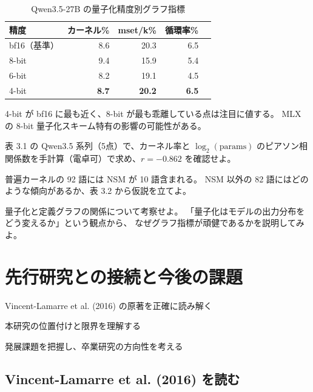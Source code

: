 \documentclass[lang=jp, color=black, mode=simple, 11pt]{elegantbook}
\begin{document}
\begin{table}[htbp]
\centering
\caption{Qwen3.5-27B の量子化精度別グラフ指標}
\begin{tabular}{lrrrr}
\toprule
精度 & カーネル\% & mset/k\% & 循環率\% \\
\midrule
bf16（基準） & 8.6 & 20.3 & 6.5 \\
8-bit        & 9.4 & 15.9 & 5.4 \\
6-bit        & 8.2 & 19.1 & 4.5 \\
4-bit        & \textbf{8.7} & \textbf{20.2} & \textbf{6.5} \\
\bottomrule
\end{tabular}
\end{table}

4-bit が bf16 に最も近く、8-bit が最も乖離している点は注目に値する。
MLX の 8-bit 量子化スキーム特有の影響の可能性がある。

\begin{problemset}[第 3 章の確認問題]
  \item 表 3.1 の Qwen3.5 系列（5点）で、カーネル率と $\log_2(\text{params})$
        のピアソン相関係数を手計算（電卓可）で求め、$r = -0.862$ を確認せよ。
  \item 普遍カーネルの 92 語には NSM が 10 語含まれる。
        NSM 以外の 82 語にはどのような傾向があるか、表 3.2 から仮説を立てよ。
  \item 量子化と定義グラフの関係について考察せよ。
        「量子化はモデルの出力分布をどう変えるか」という観点から、
        なぜグラフ指標が頑健であるかを説明してみよ。
\end{problemset}

\chapter{先行研究との接続と今後の課題}

\begin{introduction}[この章で学ぶこと]
  \item Vincent-Lamarre et al. (2016) の原著を正確に読み解く
  \item 本研究の位置付けと限界を理解する
  \item 発展課題を把握し、卒業研究の方向性を考える
\end{introduction}

\section{Vincent-Lamarre et al. (2016) を読む}
\end{document}
